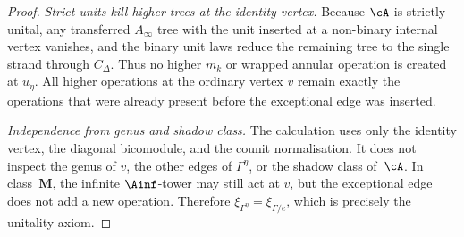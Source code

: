 \begin{proof}
\medskip\noindent
\emph{Strict units kill higher trees at the identity vertex.}
Because \(\cA\) is strictly unital, any transferred \(A_\infty\) tree
with the unit inserted at a non-binary internal vertex vanishes, and
the binary unit laws reduce the remaining tree to the single strand
through \(C_\Delta\).  Thus no higher \(m_k\) or wrapped annular
operation is created at \(u_\eta\).  All higher operations at the
ordinary vertex \(v\) remain exactly the operations that were already
present before the exceptional edge was inserted.

\medskip\noindent
\emph{Independence from genus and shadow class.}
The calculation uses only the identity vertex, the diagonal
bicomodule, and the counit normalisation.  It does not inspect the
genus of \(v\), the other edges of \(\Gamma^\eta\), or the shadow
class of~\(\cA\).  In class~\(\mathbf M\), the infinite
\(\Ainf\)-tower may still act at \(v\), but the exceptional edge
does not add a new operation.  Therefore
\(\xi_{\Gamma^\eta}=\xi_{\Gamma/e}\), which is precisely the
unitality axiom.
\end{proof}


